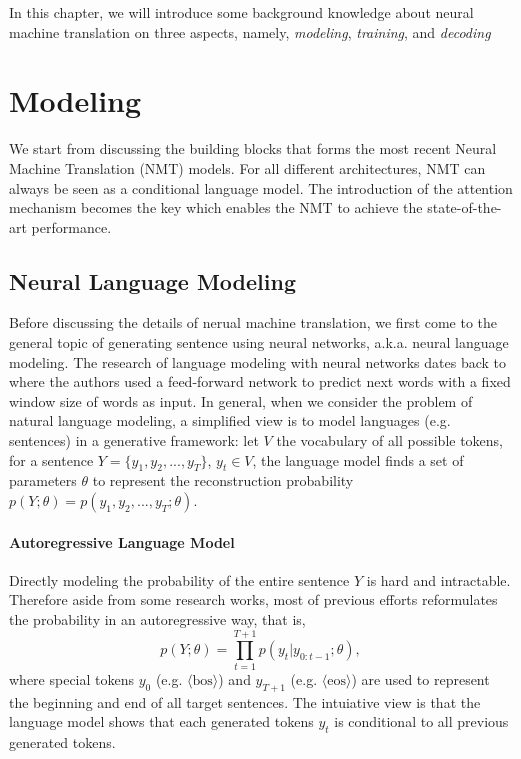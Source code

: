 In this chapter, we will introduce some background knowledge about neural machine translation on three aspects,
namely, \textit{modeling}, \textit{training}, and \textit{decoding}

\section{Modeling}
We start from discussing the building blocks that forms the most recent Neural Machine Translation (NMT) models. 
For all different architectures, NMT can always be seen as a conditional language model. 
The introduction of the attention mechanism becomes the key which enables the NMT to achieve the state-of-the-art performance.

\subsection{Neural Language Modeling}
Before discussing the details of nerual machine translation, we first come to the general topic of generating sentence using neural networks, a.k.a. neural language modeling. The research of language modeling with neural networks dates back to \citep[NNLM, ][]{bengio2003neural}  where the authors used a feed-forward network to predict next words with a fixed window size of words as input. In general, when we consider the problem of natural language modeling, a simplified view is to model languages (e.g. sentences) in a generative framework: let $V$ the vocabulary of all possible tokens, for a sentence $Y=\{y_1, y_2, ..., y_T\}$, $y_t \in V$, the language model finds a set of parameters $\theta$ to represent the reconstruction probability
$p(Y;\theta)=p(y_1, y_2, ..., y_T; \theta)$.
\paragraph{Autoregressive Language Model} Directly modeling the probability of the entire sentence $Y$ is hard and intractable. Therefore aside from some research works, most of previous efforts reformulates the probability in an autoregressive way, that is,
\begin{equation}
\label{cp2.eq.autolm}
    p(Y;\theta) = \prod_{t=1}^{T+1}p(y_t|y_{0:t-1}; \theta),
\end{equation}
where special tokens $y_0$ (e.g. $\langle \mathrm{bos}\rangle$) and $y_{T+1}$ (e.g. $\langle \mathrm{eos}\rangle$) are used to represent the beginning and end of all target sentences. The intuiative view is that the language model shows that each generated tokens $y_t$ is conditional to all previous generated tokens.

